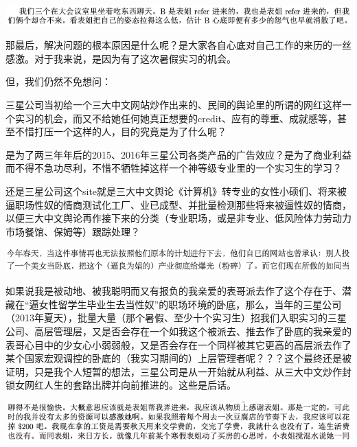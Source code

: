 \documentclass[9pt, b5paper]{article}
\begin{document}
\begin{center}
\includegraphics[width=.9\linewidth]{./pic/backups_plans_20210507_092526.png}
\end{center}

那最后，解决问题的根本原因是什么呢？是大家各自心底对自己工作的来历的一丝感激。对于我来说，是因为有了这次暑假实习的机会。

但，我们仍然不免想问：

三星公司当初给一个三大中文网站炒作出来的、民间的舆论里的所谓的网红这样一个实习的机会，而又不给她任何她真正想要的credit、应有的尊重、成就感等，甚至不惜打压一个这样的人，目的究竟是为了什么呢？

是为了两三年年后的2015、2016年三星公司各类产品的广告效应？是为了商业利益而不得不急功尽利，不惜不牺牲掉这样一个神等级专业里的一个实习生的学习？

还是三星公司这个site就是三大中文舆论《计算机》转专业的女性小硕们、将来被逼职场性奴的情商测试化工厂、业已成型、并批量检测那些将来被逼性奴的情商，以便三大中文舆论再作接下来的分类（专业职场，或是非专业、低风险体力劳动力市场餐馆、保姆等）跟踪处理？

\begin{center}
\includegraphics[width=.9\linewidth]{./pic/backups_plans_20210507_141156.png}
\end{center}

如果说我是被动地、被我聪明而又有报负的我亲爱的表哥派去作了这个存在于、潜藏在“逼女性留学生毕业生去当性奴”的职场环境的卧底，那么，当年的三星公司（2013年夏天），批量大量（那个暑假、至少十个实习生）招我们入职实习的三星公司、高层管理层，又是否会存在一个如我这个被派去、推去作了卧底的我亲爱的表哥心目中的少女心小弱弱般，又是否会存在一个同样被其它更高的高层派去作了某个国家宏观调控的卧底的（我实习期间的）上层管理者呢？？？这个最终还是被证明，只是我个人短暂的想法，三星公司是从一开始就从利益、从三大中文炒作封锁女网红人生的套路出牌并向前推进的。这些是后话。 

\begin{center}
\includegraphics[width=.9\linewidth]{./pic/backups_plans_20210507_092150.png}
\end{center}
\end{document}

